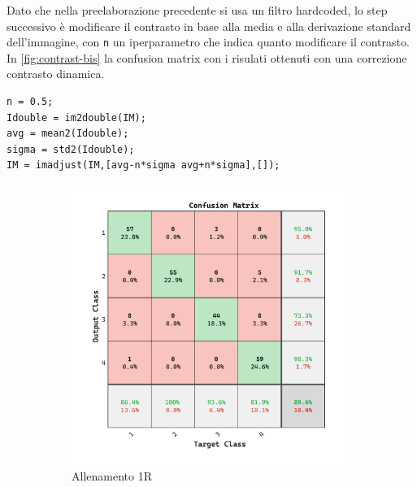 Dato che nella preelaborazione precedente si usa un filtro hardcoded, lo step successivo è modificare il  contrasto in base alla media e alla derivazione standard dell'immagine, con \lstinline{n} un iperparametro che indica quanto modificare il contrasto. In \cref{fig:contrast-bis}  la confusion matrix con i risulati ottenuti con una correzione contrasto dinamica.
\begin{lstlisting}
n = 0.5;  
Idouble = im2double(IM); 
avg = mean2(Idouble);
sigma = std2(Idouble);
IM = imadjust(IM,[avg-n*sigma avg+n*sigma],[]);
\end{lstlisting}

\begin{figure}[ht]
    \centering
    \begin{subfigure}{0.45\textwidth}
        \includegraphics[width=\textwidth]{addestramento-rete-neurale/one-contrast-bis.pdf}
        \caption{Allenamento 1R} 
    \end{subfigure}
    \begin{subfigure}{0.45\textwidth}

\end{subfigure}
\end{figure}
